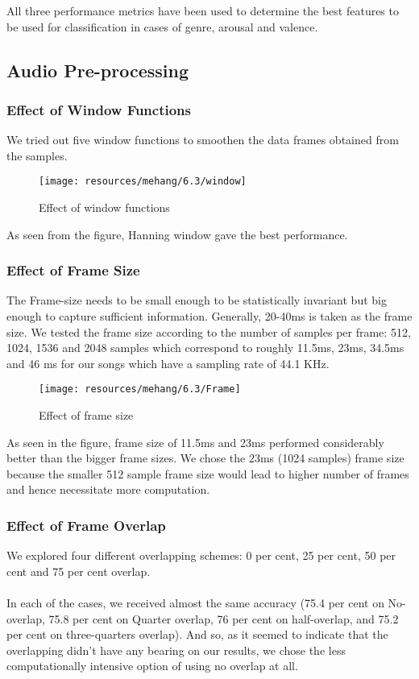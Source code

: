         All three performance metrics have been used to determine the best features to be used for classification in cases of genre, arousal and valence.

\subsection{Audio Pre-processing}
\subsubsection{Effect of Window Functions}
We tried out five window functions to smoothen the data frames obtained from the samples. 

\begin{figure}[h!]
        \centering
        \texttt{[image: resources/mehang/6.3/window]}
        \caption{Effect of window functions}
\end{figure}

As seen from the figure, Hanning window gave the best performance. 

\subsubsection{Effect of Frame Size}
The Frame-size needs to be small enough to be statistically invariant but big enough to capture sufficient information. Generally, 20-40ms is taken as the frame size. We tested the frame size according to the number of samples per frame: 512, 1024, 1536 and 2048 samples which correspond to roughly 11.5ms, 23ms, 34.5ms and 46 ms for our songs which have a sampling rate of 44.1 KHz.

\begin{figure}[h!]
        \centering
        \texttt{[image: resources/mehang/6.3/Frame]}
        \caption{Effect of frame size}
\end{figure}

As seen in the figure, frame size of 11.5ms and 23ms performed considerably better than the bigger frame sizes. We chose the 23ms (1024 samples) frame size because the smaller 512 sample frame size would lead to higher number of frames and hence necessitate more computation.

\subsubsection{Effect of Frame Overlap}
We explored four different overlapping schemes: 0 per cent, 25 per cent, 50 per cent and 75 per cent overlap.\\
\\
In each of the cases, we received almost the same accuracy (75.4 per cent on No-overlap, 75.8 per cent on Quarter overlap, 76 per cent on half-overlap, and 75.2 per cent on three-quarters overlap). And so, as it seemed to indicate that the overlapping didn’t have any bearing on our results, we chose the less computationally intensive option of using no overlap at all. 

